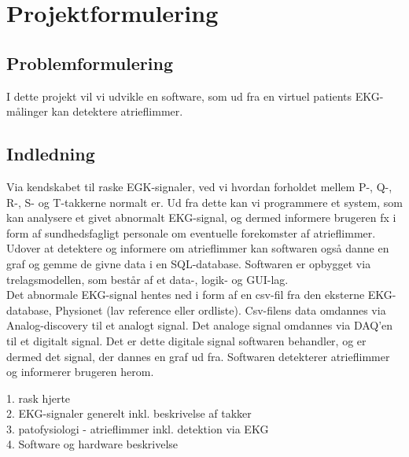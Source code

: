 \chapter{Projektformulering}
\section{Problemformulering}
 I dette projekt vil vi udvikle en software, som ud fra en virtuel patients EKG-målinger kan detektere atrieflimmer. 
\section{Indledning}
Via kendskabet til raske EGK-signaler, ved vi hvordan forholdet mellem P-, Q-, R-, S- og T-takkerne normalt er. Ud fra dette kan vi programmere et system, som kan analysere et givet abnormalt EKG-signal, og dermed informere brugeren fx i form af sundhedsfagligt personale om eventuelle forekomster af atrieflimmer.\\
Udover at detektere og informere om atrieflimmer kan softwaren også danne en graf og gemme de givne data i en SQL-database. Softwaren er opbygget via trelagsmodellen, som består af et data-, logik- og GUI-lag.
\\
Det abnormale EKG-signal hentes ned i form af en csv-fil fra den eksterne EKG-database, Physionet (lav reference eller ordliste). Csv-filens data omdannes via Analog-discovery til et analogt signal. Det analoge signal omdannes via DAQ'en til et digitalt signal. Det er dette digitale signal softwaren behandler, og er dermed det signal, der dannes en graf ud fra. Softwaren detekterer atrieflimmer og informerer brugeren herom.     


1. rask hjerte\\
2. EKG-signaler generelt inkl. beskrivelse af takker\\
3. patofysiologi - atrieflimmer inkl. detektion via EKG\\
4. Software og hardware beskrivelse